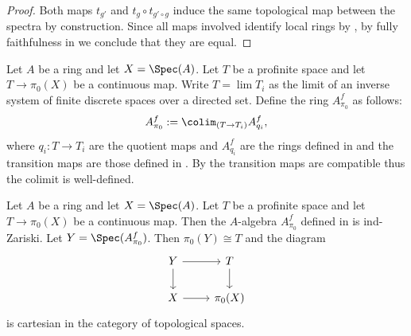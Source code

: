 \begin{proof}
  Both maps \(t_{g'}\) and \(t_{g} \circ t_{g' \circ g}\) induce the same topological map between the spectra by construction. Since all maps involved identify local rings by , by fully faithfulness in  we conclude that they are equal.
\end{proof}

\begin{definition}
  \label{def:modify-pi0-profinite}
  Let $A$ be a ring and let $X = \Spec (A)$. Let $T$ be a profinite space and let $T \to \pi_0(X)$ be a continuous map. Write $T = \lim T_i$ as the limit of an inverse system of finite discrete spaces over a directed set. Define the ring \(A^f_{\pi_0}\) as follows:
  \[
    A^f_{\pi_0} := \colim_{(T \to T_i)} A^f_{q_i},
  \]
  where \(q_i : T \to T_i\) are the quotient maps and \(A^f_{q_i}\) are the rings defined in  and the transition maps are those defined in . By  the transition maps are compatible thus the colimit is well-defined.
\end{definition}

\begin{lemma}
  \label{thm:modify-pi0-profinite-properties}
  Let $A$ be a ring and let $X = \Spec (A)$. Let $T$ be a profinite space and let $T \to \pi_0(X)$ be a continuous map. Then the $A$-algebra $A^f_{\pi_0}$ defined in  is ind-Zariski. Let $Y = \Spec (A^f_{\pi_0})$. Then $\pi_0(Y) \cong T$ and the diagram
  \[
  \begin{tikzcd}
  Y \arrow[r] \arrow[d] & T \arrow[d] \\
  X \arrow[r] & \pi_0(X)
  \end{tikzcd}
  \]
  is cartesian in the category of topological spaces.
\end{lemma}

